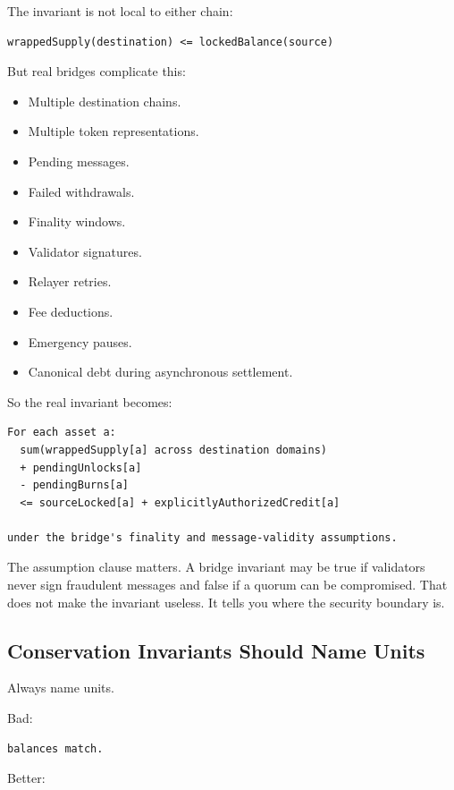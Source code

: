 The invariant is not local to either chain:

\begin{lstlisting}
wrappedSupply(destination) <= lockedBalance(source)
\end{lstlisting}

But real bridges complicate this:

\begin{itemize}
\tightlist
\item
  Multiple destination chains.
\item
  Multiple token representations.
\item
  Pending messages.
\item
  Failed withdrawals.
\item
  Finality windows.
\item
  Validator signatures.
\item
  Relayer retries.
\item
  Fee deductions.
\item
  Emergency pauses.
\item
  Canonical debt during asynchronous settlement.
\end{itemize}

So the real invariant becomes:

\begin{lstlisting}
For each asset a:
  sum(wrappedSupply[a] across destination domains)
  + pendingUnlocks[a]
  - pendingBurns[a]
  <= sourceLocked[a] + explicitlyAuthorizedCredit[a]

under the bridge's finality and message-validity assumptions.
\end{lstlisting}

The assumption clause matters. A bridge invariant may be true if
validators never sign fraudulent messages and false if a quorum can be
compromised. That does not make the invariant useless. It tells you
where the security boundary is.

\subsection{Conservation Invariants Should Name Units}

Always name units.

Bad:

\begin{lstlisting}
balances match.
\end{lstlisting}

Better:

